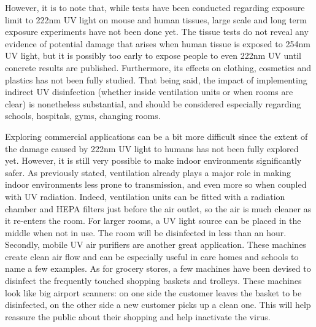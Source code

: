 \documentclass[11pt]{report}
\begin{document}
However, it is to note that, while tests have been conducted regarding exposure limit to 222nm UV light on mouse and human tissues, large scale and long term exposure experiments have not been done yet. The tissue tests do not reveal any evidence of potential damage that arises when human tissue is exposed to 254nm UV light, but it is possibly too early to expose people to even 222nm UV until concrete results are published. Furthermore, its effects on clothing, cosmetics and plastics has not been fully studied. That being said, the impact of implementing indirect UV disinfection (whether inside ventilation units or when rooms are clear) is nonetheless substantial, and should be considered especially regarding schools, hospitals, gyms, changing rooms. 

Exploring commercial applications can be a bit more difficult since the extent of the damage caused by 222nm UV light to humans has not been fully explored yet. However, it is still very possible to make indoor environments significantly safer. As previously stated, ventilation already plays a major role in making indoor environments less prone to transmission, and even more so when coupled with UV radiation. Indeed, ventilation units can be fitted with a radiation chamber and HEPA filters just before the air outlet, so the air is much cleaner as it re-enters the room. For larger rooms, a UV light source can be placed in the middle when not in use. The room will be disinfected in less than an hour. Secondly, mobile UV air purifiers are another great application. These machines create clean air flow and can be especially useful in care homes and schools to name a few examples. As for grocery stores, a few machines have been devised to disinfect the frequently touched shopping baskets and trolleys. These machines look like big airport scanners: on one side the customer leaves the basket to be disinfected, on the other side a new customer picks up a clean one. This will help reassure the public about their shopping and help inactivate the virus.
\end{document}
